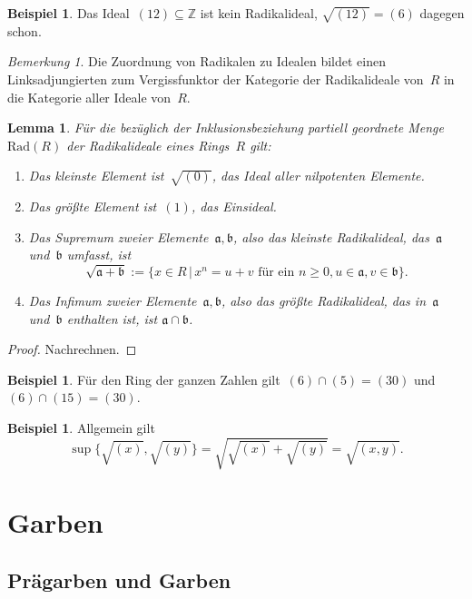 \documentclass[a4paper,ngerman,12pt]{scrartcl}
\theoremstyle{definition}
\newtheorem{bsp}[defn]{Beispiel}
\theoremstyle{plain}
\newtheorem{lemma}[defn]{Lemma}
\theoremstyle{remark}
\newtheorem{bem}[defn]{Bemerkung}
\newcommand{\ZZ}{\mathbb{Z}}
\renewcommand{\aa}{\mathfrak{a}}
\newcommand{\bb}{\mathfrak{b}}
\newcommand{\Rad}{\mathrm{Rad}}
\renewcommand{\_}{\mathpunct{.}\,}
\newcommand{\?}{\,{:}\,}
\begin{document}
\begin{bsp}Das Ideal~$(12) \subseteq \ZZ$ ist kein Radikalideal, $\sqrt{(12)} =
(6)$ dagegen schon.\end{bsp}

\begin{bem}Die Zuordnung von Radikalen zu Idealen bildet einen
Linksadjungierten zum Vergissfunktor der Kategorie der Radikalideale von~$R$ in
die Kategorie aller Ideale von~$R$.\end{bem}

\begin{lemma}\label{lemma:rad}%
Für die bezüglich der Inklusionsbeziehung partiell geordnete Menge~$\Rad(R)$
der Radikalideale eines Rings~$R$ gilt:
\begin{enumerate}
\item Das kleinste Element ist~$\sqrt{(0)}$, das Ideal aller nilpotenten
Elemente.
\item Das größte Element ist~$(1)$, das Einsideal.
\item Das Supremum zweier Elemente~$\aa,\bb$, also das kleinste Radikalideal,
das~$\aa$ und~$\bb$ umfasst, ist
\[ \sqrt{\aa + \bb} := \{ x \in R \,|\, \text{$x^n = u + v$ für ein~$n \geq 0,
u \in \aa, v \in \bb$} \}. \]
\item Das Infimum zweier Elemente~$\aa,\bb$, also das größte Radikalideal,
das in~$\aa$ und~$\bb$ enthalten ist, ist $\aa \cap \bb$.
\end{enumerate}
\end{lemma}
\begin{proof}Nachrechnen.\end{proof}

\begin{bsp}Für den Ring der ganzen Zahlen gilt~$(6) \cap (5) = (30)$ und~$(6)
\cap (15) = (30)$.\end{bsp}

\begin{bsp}Allgemein gilt
\[ \sup\bigl\{ \sqrt{(x)}, \sqrt{(y)} \bigr\} = \sqrt{\sqrt{(x)} + \sqrt{(y)}} =
\sqrt{(x,y)}. \]
\end{bsp}


\section{Garben}

\label{appendix:garben}

\subsection{Prägarben und Garben}
\end{document}
